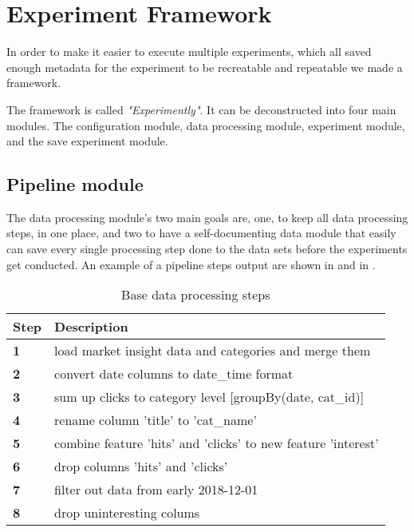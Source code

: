 \section{Experiment Framework}
\label{section:method:experiment-framework}
In order to make it easier to execute multiple experiments, which all saved
enough metadata for the experiment to be recreatable and repeatable we made
a framework.

The framework is called \textit{"Experimently"}. It can be deconstructed into
four main modules. The configuration module, data processing module, experiment module, and the save experiment module.


\subsection{Pipeline module}
\label{section:Method:Pipeline}
The data processing module's two main goals are, one, to keep all data processing steps,
in one place, and two to have a self-documenting data module that easily can
save every single processing step done to the data sets before the
experiments get conducted.
An example of a pipeline steps output are shown in 
and in .

\begin{table}[h]
  \caption{Base data processing steps}
  \label{table:base_data_processing_steps}
  \begin{tabular}{ll}
    \toprule
    Step       & Description                                                   \\
    \midrule
    \textbf{1} & load market insight data and categories and merge them        \\
    \textbf{2} & convert date columns to date\_time format                     \\
    \textbf{3} & sum up clicks to category level [groupBy(date, cat\_id)]      \\
    \textbf{4} & rename column 'title' to 'cat\_name'                          \\
    \textbf{5} & combine feature 'hits' and 'clicks' to new feature 'interest' \\
    \textbf{6} & drop columns 'hits' and 'clicks'                              \\
    \textbf{7} & filter out data from early 2018-12-01                         \\
    \textbf{8} & drop uninteresting colums                                     \\
    \bottomrule
  \end{tabular}
\end{table}

